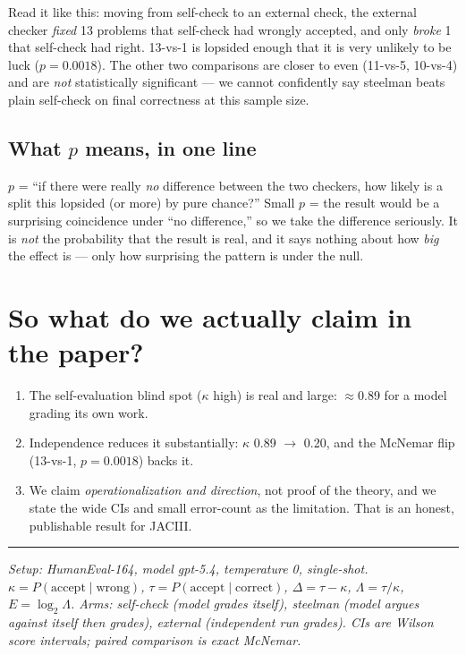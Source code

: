 \documentclass[11pt]{article}
\begin{document}
Read it like this: moving from self-check to an external check, the external checker \emph{fixed} 13 problems that self-check had wrongly accepted, and only \emph{broke} 1 that self-check had right. 13-vs-1 is lopsided enough that it is very unlikely to be luck ($p=0.0018$). The other two comparisons are closer to even (11-vs-5, 10-vs-4) and are \emph{not} statistically significant --- we cannot confidently say steelman beats plain self-check on final correctness at this sample size.

\subsection*{What $p$ means, in one line}
$p$ = ``if there were really \emph{no} difference between the two checkers, how likely is a split this lopsided (or more) by pure chance?'' Small $p$ = the result would be a surprising coincidence under ``no difference,'' so we take the difference seriously. It is \emph{not} the probability that the result is real, and it says nothing about how \emph{big} the effect is --- only how surprising the pattern is under the null.

\section*{So what do we actually claim in the paper?}
\begin{enumerate}[leftmargin=1.6em]
\item The self-evaluation blind spot ($\kappa$ high) is real and large: $\approx$0.89 for a model grading its own work.
\item Independence reduces it substantially: $\kappa$ 0.89 $\to$ 0.20, and the McNemar flip (13-vs-1, $p=0.0018$) backs it.
\item We claim \emph{operationalization and direction}, not proof of the theory, and we state the wide CIs and small error-count as the limitation. That is an honest, publishable result for JACIII.
\end{enumerate}

\vspace{1em}
\hrule
\vspace{0.5em}
\small\textit{Setup: HumanEval-164, model gpt-5.4, temperature 0, single-shot. $\kappa=P(\text{accept}\mid\text{wrong})$, $\tau=P(\text{accept}\mid\text{correct})$, $\Delta=\tau-\kappa$, $\Lambda=\tau/\kappa$, $E=\log_2\Lambda$. Arms: self-check (model grades itself), steelman (model argues against itself then grades), external (independent run grades). CIs are Wilson score intervals; paired comparison is exact McNemar.}
\end{document}

